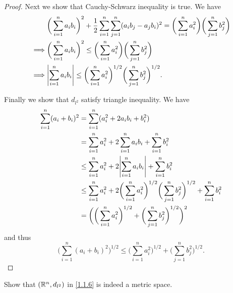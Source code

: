 \begin{proof}
  Next we show that Cauchy-Schwarz inequality is true.
  We have
  \begin{align*}
             & \bigg(\sum_{i = 1}^n a_i b_i\bigg)^2 + \dfrac{1}{2} \sum_{i = 1}^n \sum_{j = 1}^n (a_i b_j - a_j b_i)^2 = \bigg(\sum_{i = 1}^n a_i^2\bigg) \bigg(\sum_{j = 1}^n b_j^2\bigg) \\
    \implies & \bigg(\sum_{i = 1}^n a_i b_i\bigg)^2 \leq \bigg(\sum_{i = 1}^n a_i^2\bigg) \bigg(\sum_{j = 1}^n b_j^2\bigg)                                                                 \\
    \implies & \abs{\sum_{i = 1}^n a_i b_i} \leq \bigg(\sum_{i = 1}^n a_i^2\bigg)^{1 / 2} \bigg(\sum_{j = 1}^n b_j^2\bigg)^{1 / 2}.
  \end{align*}

  Finally we show that \(d_{l^2}\) satisfy triangle inequality.
  We have
  \begin{align*}
    \sum_{i = 1}^n (a_i + b_i)^2 & = \sum_{i = 1}^n (a_i^2 + 2 a_i b_i + b_i^2)                                                                                           \\
                                 & = \sum_{i = 1}^n a_i^2 + 2 \sum_{i = 1}^n a_i b_i + \sum_{i = 1}^n b_i^2                                                               \\
                                 & \leq \sum_{i = 1}^n a_i^2 + 2 \abs{\sum_{i = 1}^n a_i b_i} + \sum_{i = 1}^n b_i^2                                                      \\
                                 & \leq \sum_{i = 1}^n a_i^2 + 2 \bigg(\sum_{i = 1}^n a_i^2\bigg)^{1 / 2} \bigg(\sum_{j = 1}^n b_j^2\bigg)^{1 / 2} + \sum_{i = 1}^n b_i^2 \\
                                 & = \bigg(\bigg(\sum_{i = 1}^n a_i^2\bigg)^{1 / 2} + \bigg(\sum_{j = 1}^n b_j^2\bigg)^{1 / 2}\bigg)^2
  \end{align*}
  and thus
  \[
    \bigg(\sum_{i = 1}^n (a_i + b_i)^2\bigg)^{1 / 2} \leq \bigg(\sum_{i = 1}^n a_i^2\bigg)^{1 / 2} + \bigg(\sum_{j = 1}^n b_j^2\bigg)^{1 / 2}.
  \]
\end{proof}

\begin{ex}\label{ex:1.1.6}
  Show that \((\mathbb{R}^n, d_{l^2})\) in \cref{1.1.6} is indeed a metric space.
\end{ex}

